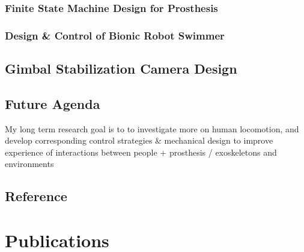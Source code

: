 \documentclass[12pt]{article}
\begin{document}
            \subsubsection{Finite State Machine Design for Prosthesis}

        \subsubsection{Design \& Control of Bionic Robot Swimmer} 


        \subsection{Gimbal Stabilization Camera Design}

    \subsection{Future Agenda}

        My long term research goal is to to investigate more on human locomotion, and develop corresponding control strategies \& mechanical design to improve experience of interactions between people + prosthesis / exoskeletons and environments \cite{SpringDesign_OSL}

    \subsection{Reference}

\section{Publications}



\end{document}

